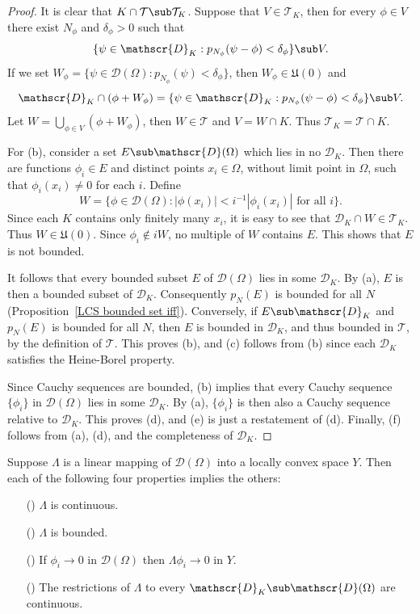 \begin{proof}
It is clear that $K\cap\mathcal{T}\sub\mathcal{T}_K$. Suppose that $V\in\mathcal{T}_K$, then for every $\phi\in V$ there exist $N_\phi$ and $\delta_\phi>0$ such that
\[\{\psi\in\mathscr{D}_K:p_{N_\phi}(\psi-\phi)<\delta_\phi\}\sub V.\]
If we set $W_\phi=\{\psi\in\mathscr{D}(\Omega):p_{N_\phi}(\psi)<\delta_\phi\}$, then $W_\phi\in\mathfrak{U}(0)$ and
\[\mathscr{D}_K\cap(\phi+W_\phi)=\{\psi\in\mathscr{D}_K:p_{N_\phi}(\psi-\phi)<\delta_\phi\}\sub V.\]
Let $W=\bigcup_{\phi\in V}(\phi+W_\phi)$, then $W\in\mathcal{T}$ and $V=W\cap K$. Thus $\mathcal{T}_K=\mathcal{T}\cap K$.\par
For (b), consider a set $E\sub\mathscr{D}(\Omega)$ which lies in no $\mathscr{D}_K$. Then there are functions $\phi_i\in E$ and distinct points $x_i\in\Omega$, without limit point in $\Omega$, such that $\phi_i(x_i)\neq 0$ for each $i$. Define
\[W=\{\phi\in\mathscr{D}(\Omega):|\phi(x_i)|<i^{-1}|\phi_i(x_i)|\text{ for all $i$}\}.\]
Since each $K$ contains only finitely many $x_i$, it is easy to see that $\mathscr{D}_K\cap W\in\mathcal{T}_K$. Thus $W\in\mathfrak{U}(0)$. Since $\phi_i\notin iW$, no multiple of $W$ contains $E$. This shows that $E$ is not bounded.\par
It follows that every bounded subset $E$ of $\mathscr{D}(\Omega)$ lies in some $\mathscr{D}_K$. By (a), $E$ is then a bounded subset of $\mathscr{D}_K$. Consequently $p_N(E)$ is bounded for all $N$ (Proposition~\ref{LCS bounded set iff}). Conversely, if $E\sub\mathscr{D}_K$ and $p_N(E)$ is bounded for all $N$, then $E$ is bounded in $\mathscr{D}_K$, and thus bounded in $\mathcal{T}$, by the definition of $\mathcal{T}$. This proves (b), and (c) follows from (b) since each $\mathscr{D}_K$ satisfies the Heine-Borel property.\par
Since Cauchy sequences are bounded, (b) implies that every Cauchy sequence $\{\phi_i\}$ in $\mathscr{D}(\Omega)$ lies in some $\mathscr{D}_K$. By (a), $\{\phi_i\}$ is then also a Cauchy sequence relative to $\mathscr{D}_K$. This proves (d), and (e) is just a restatement of (d). Finally, (f) follows from (a), (d), and the completeness of $\mathscr{D}_K$.
\end{proof}
\begin{theorem}\label{continuous on test function iff}
Suppose $\Lambda$ is a linear mapping of $\mathscr{D}(\Omega)$ into a locally convex space $Y$. Then each of the following four properties implies the others:
\begin{itemize}
\item[(\rmnum{1})] $\Lambda$ is continuous.
\item[(\rmnum{2})] $\Lambda$ is bounded.
\item[(\rmnum{3})] If $\phi_i\to 0$ in $\mathscr{D}(\Omega)$ then $\Lambda\phi_i\to 0$ in $Y$.
\item[(\rmnum{4})] The restrictions of $\Lambda$ to every $\mathscr{D}_K\sub\mathscr{D}(\Omega)$ are continuous. 
\end{itemize}
\end{theorem}

